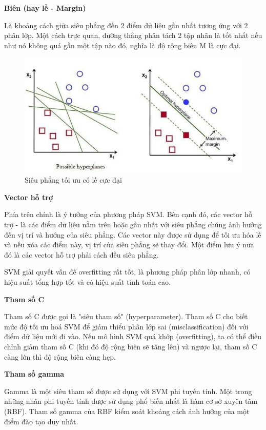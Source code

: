 \documentclass[12pt,a4paper,oneside]{book}
\begin{document}
		\textbf{Biên (hay lề - Margin)}
		
		Là khoảng cách giữa siêu phẳng đến 2 điểm dữ liệu gần	nhất tương ứng với 2 phân lớp. Một cách trực quan, đường thẳng phân tách 2 tập nhãn là tốt nhất nếu như nó không quá gần một tập nào đó, nghĩa là độ rộng biên M là cực đại.
		
			\begin{figure}[H]
			\begin{center}
				\includegraphics[width=0.68\columnwidth]{SVM_maxmargin}
			\end{center}
			\caption{Siêu phẳng tối ưu có lề cực đại}
			\end{figure}
		
		\textbf{Vector hỗ trợ}
		
		Phía trên chính là ý tưởng của phương pháp SVM. Bên cạnh đó, các vector hỗ trợ - là các điểm dữ liệu nằm trên hoặc gần nhất với siêu phẳng chúng ảnh hưởng đến vị trí và hướng của siêu phẳng. Các vector này được sử dụng để tối ưu hóa lề và nếu xóa các điểm này, vị trí của siêu phẳng sẽ thay đổi. Một điểm lưu ý nữa đó là các vector hỗ trợ phải cách đều siêu phẳng.
		
		SVM giải quyết vấn đề overfitting rất tốt, là phương pháp phân lớp nhanh, có hiệu suất tổng hợp tốt và có hiệu suất tính toán cao.
		
		\textbf{Tham số C}
		
		Tham số C được gọi là "siêu tham số" (hyperparameter). Tham số C cho biết mức độ tối ưu hoá SVM để giảm thiểu phân lớp sai (misclassification) đối với điểm dữ liệu mới đi vào. Nếu mô hình SVM quá khớp (overfitting), ta có thể điều chỉnh giảm tham số C (khi đó độ rộng biên sẽ tăng lên) và ngược lại, tham số C càng lớn thì độ rộng biên càng hẹp.
		
		\textbf{Tham số gamma}
		
		Gamma là một siêu tham số được sử dụng với SVM phi tuyến tính. Một trong những nhân phi tuyến tính được sử dụng phổ biến nhất là hàm cơ sở xuyên tâm (RBF). Tham số gamma của RBF kiểm soát khoảng cách ảnh hưởng của một điểm đào tạo duy nhất.
		
\end{document}
